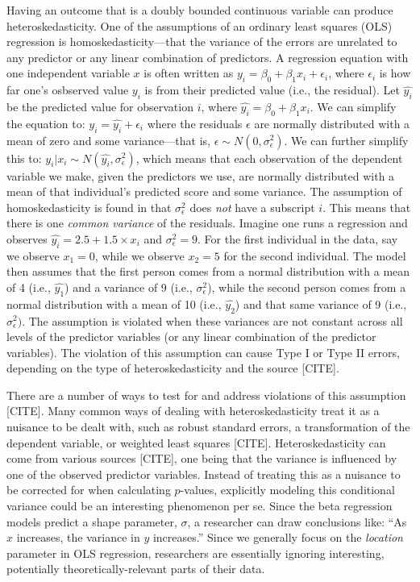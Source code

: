 \documentclass[english,man]{apa6}
\theoremstyle{definition}
\theoremstyle{definition}
\theoremstyle{remark}
\begin{document}
Having an outcome that is a doubly bounded continuous variable can
produce heteroskedasticity. One of the assumptions of an ordinary least
squares (OLS) regression is homoskedasticity---that the variance of the
errors are unrelated to any predictor or any linear combination of
predictors. A regression equation with one independent variable \(x\) is
often written as \(y_i = \beta_0 + \beta_1x_i + \epsilon_i\), where
\(\epsilon_i\) is how far one's osbserved value \(y_i\) is from their
predicted value (i.e., the residual). Let \(\hat{y_i}\) be the predicted
value for observation \(i\), where \(\hat{y_i} = \beta_0 + \beta_1x_i\).
We can simplify the equation to: \(y_i = \hat{y_i} + \epsilon_i\) where
the residuals \(\epsilon\) are normally distributed with a mean of zero
and some variance---that is, \(\epsilon \sim N(0, \sigma^2_\epsilon)\).
We can further simplify this to:
\(y_i|x_i \sim N(\hat{y_i}, \sigma^2_\epsilon)\), which means that each
observation of the dependent variable we make, given the predictors we
use, are normally distributed with a mean of that individual's predicted
score and some variance. The assumption of homoskedasticity is found in
that \(\sigma^2_\epsilon\) does \emph{not} have a subscript \(i\). This
means that there is one \emph{common variance} of the residuals. Imagine
one runs a regression and observes \(\hat{y_i} = 2.5 + 1.5 \times x_i\)
and \(\sigma^2_\epsilon = 9\). For the first individual in the data, say
we observe \(x_1 = 0\), while we observe \(x_2 = 5\) for the second
individual. The model then assumes that the first person comes from a
normal distribution with a mean of 4 (i.e., \(\hat{y_1}\)) and a
variance of 9 (i.e., \(\sigma^2_\epsilon\)), while the second person
comes from a normal distribution with a mean of 10 (i.e., \(\hat{y_2}\))
and that same variance of 9 (i.e., \(\sigma^2_\epsilon)\). The
assumption is violated when these variances are not constant across all
levels of the predictor variables (or any linear combination of the
predictor variables). The violation of this assumption can cause Type I
or Type II errors, depending on the type of heteroskedasticity and the
source {[}CITE{]}.

There are a number of ways to test for and address violations of this
assumption {[}CITE{]}. Many common ways of dealing with
heteroskedasticity treat it as a nuisance to be dealt with, such as
robust standard errors, a transformation of the dependent variable, or
weighted least squares {[}CITE{]}. Heteroskedasticity can come from
various sources {[}CITE{]}, one being that the variance is influenced by
one of the observed predictor variables. Instead of treating this as a
nuisance to be corrected for when calculating \(p\)-values, explicitly
modeling this conditional variance could be an interesting phenomenon
per se. Since the beta regression models predict a shape parameter,
\(\sigma\), a researcher can draw conclusions like: \enquote{As \(x\)
increases, the variance in \(y\) increases.} Since we generally focus on
the \emph{location} parameter in OLS regression, researchers are
essentially ignoring interesting, potentially theoretically-relevant
parts of their data.
\end{document}
